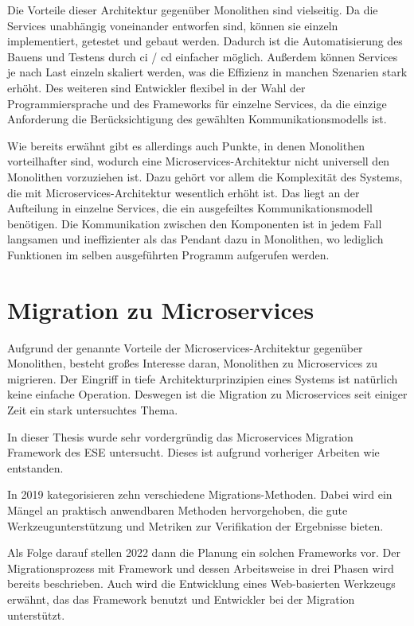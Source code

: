 Die Vorteile dieser Architektur gegenüber Monolithen sind vielseitig.
Da die Services unabhängig voneinander entworfen sind, können sie einzeln implementiert, getestet und gebaut werden.
Dadurch ist die Automatisierung des Bauens und Testens durch \gls{ci} / \gls{cd} einfacher möglich.
Außerdem können Services je nach Last einzeln skaliert werden, was die Effizienz in manchen Szenarien stark erhöht.
Des weiteren sind Entwickler flexibel in der Wahl der Programmiersprache und des Frameworks für einzelne Services, da die einzige Anforderung die Berücksichtigung des gewählten Kommunikationsmodells ist.

Wie bereits erwähnt gibt es allerdings auch Punkte, in denen Monolithen vorteilhafter sind, wodurch eine Microservices-Architektur nicht universell den Monolithen vorzuziehen ist.
Dazu gehört vor allem die Komplexität des Systems, die mit Microservices-Architektur wesentlich erhöht ist.
Das liegt an der Aufteilung in einzelne Services, die ein ausgefeiltes Kommunikationsmodell benötigen.
Die Kommunikation zwischen den Komponenten ist in jedem Fall langsamen und ineffizienter als das Pendant dazu in Monolithen, wo lediglich Funktionen im selben ausgeführten Programm aufgerufen werden.

\section{Migration zu Microservices}

Aufgrund der genannte Vorteile der Microservices-Architektur gegenüber Monolithen, besteht großes Interesse daran, Monolithen zu Microservices zu migrieren.
Der Eingriff in tiefe Architekturprinzipien eines Systems ist natürlich keine einfache Operation.
Deswegen ist die Migration zu Microservices seit einiger Zeit ein stark untersuchtes Thema.

In dieser Thesis wurde sehr vordergründig das Microservices Migration Framework des ESE  untersucht.
Dieses ist aufgrund vorheriger Arbeiten wie  entstanden.

In 2019 kategorisieren  zehn verschiedene Migrations-Methoden.
Dabei wird ein Mängel an praktisch anwendbaren Methoden hervorgehoben, die gute Werkzeugunterstützung und Metriken zur Verifikation der Ergebnisse bieten.

Als Folge darauf stellen  2022 dann die Planung ein solchen Frameworks vor. Der Migrationsprozess mit Framework und dessen Arbeitsweise in drei Phasen wird bereits beschrieben. Auch wird die Entwicklung eines Web-basierten Werkzeugs erwähnt, das das Framework benutzt und Entwickler bei der Migration unterstützt.

